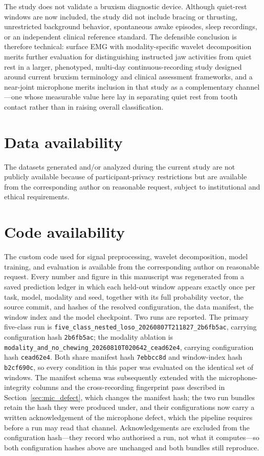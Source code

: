 \documentclass[pdflatex,sn-nature,iicol]{sn-jnl}
\begin{document}
The study does not validate a bruxism diagnostic device. Although quiet-rest windows are now included, the study did not include bracing or thrusting, unrestricted background behavior, spontaneous awake episodes, sleep recordings, or an independent clinical reference standard. The defensible conclusion is therefore technical: surface EMG with modality-specific wavelet decomposition merits further evaluation for distinguishing instructed jaw activities from quiet rest in a larger, phenotyped, multi-day continuous-recording study designed around current bruxism terminology and clinical assessment frameworks, and a near-joint microphone merits inclusion in that study as a complementary channel---one whose measurable value here lay in separating quiet rest from tooth contact rather than in raising overall classification.

\backmatter

\section*{Data availability}
The datasets generated and/or analyzed during the current study are not publicly available because of participant-privacy restrictions but are available from the corresponding author on reasonable request, subject to institutional and ethical requirements.

\section*{Code availability}
The custom code used for signal preprocessing, wavelet decomposition, model training, and evaluation is available from the corresponding author on reasonable request. Every number and figure in this manuscript was regenerated from a saved prediction ledger in which each held-out window appears exactly once per task, model, modality and seed, together with its full probability vector, the source commit, and hashes of the resolved configuration, the data manifest, the window index and the model checkpoint. Two runs are reported. The primary five-class run is \texttt{five\_class\_nested\_loso\_}\allowbreak\texttt{20260807T211827\_2b6fb5ac}, carrying configuration hash \texttt{2b6fb5ac}; the modality ablation is \texttt{modality\_and\_no\_chewing\_}\allowbreak\texttt{20260810T020642\_cead62e4}, carrying configuration hash \texttt{cead62e4}. Both share manifest hash \texttt{7ebbcc8d} and window-index hash \texttt{b2cf690c}, so every condition in this paper was evaluated on the identical set of windows. The manifest schema was subsequently extended with the microphone-integrity columns and the cross-recording fingerprint pass described in Section~\ref{sec:mic_defect}, which changes the manifest hash; the two run bundles retain the hash they were produced under, and their configurations now carry a written acknowledgement of the microphone defect, which the pipeline requires before a run may read that channel. Acknowledgements are excluded from the configuration hash---they record who authorised a run, not what it computes---so both configuration hashes above are unchanged and both bundles still reproduce.
\end{document}
